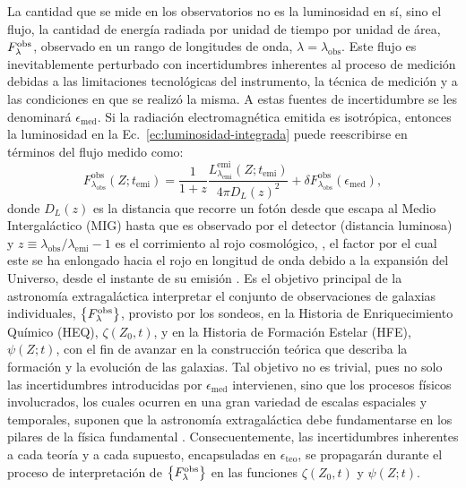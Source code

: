 La cantidad que se mide en los observatorios no es la luminosidad en sí, sino el flujo, \ie la
cantidad de energía radiada por unidad de tiempo por unidad de área, $\sedt[F]{obs}$, observado en
un rango de longitudes de onda, $\lambda=\lambda_\text{obs}$. Este flujo es inevitablemente
perturbado con incertidumbres inherentes al proceso de medición debidas a las limitaciones
tecnológicas del instrumento, la técnica de medición y a las condiciones en que se realizó la misma.
A estas fuentes de incertidumbre se les denominará $\epsilon_\text{med}$. Si la radiación
electromagnética emitida es isotrópica, entonces la luminosidad en la
Ec.~\eqref{ec:luminosidad-integrada} puede reescribirse en términos del flujo medido como:
%
\begin{equation}\label{ec:flujo-integrado}
F_{\lambda_\text{obs}}^\text{obs}(Z;t_\text{emi}) = \frac{1}{1+z}\frac{L_{\lambda_\text{emi}}^\text{emi}(Z;t_\text{emi})}{4\pi D_L(z)^2} + \delta{F_{\lambda_\text{obs}}^\text{obs}}(\epsilon_\text{med}),
\end{equation}
%
donde $D_L(z)$ es la distancia que recorre un fotón desde que escapa al Medio Intergaláctico (MIG)
hasta que es observado por el detector (distancia luminosa) y
$z\equiv\lambda_\text{obs}/\lambda_\text{emi}-1$ es el corrimiento al rojo cosmológico, \ie, el
factor por el cual este se ha enlongado hacia el rojo en longitud de onda debido a la expansión del
Universo, desde el instante de su emisión \citep{Hogg1999, Hogg2002}. Es el objetivo principal de la
astronomía extragaláctica interpretar el conjunto de observaciones de galaxias individuales,
$\set{\sedt[F]{obs}}$, provisto por los sondeos, en la Historia de Enriquecimiento Químico (HEQ),
$\zeta(Z_0,t)$, y en la Historia de Formación Estelar (HFE), $\psi(Z;t)$, con el fin de avanzar en
la construcción teórica que describa la formación y la evolución de las galaxias. Tal objetivo no es
trivial, pues no solo las incertidumbres introducidas por $\epsilon_\text{med}$ intervienen, sino
que los procesos físicos involucrados, los cuales ocurren en una gran variedad de escalas espaciales
y temporales, suponen que la astronomía extragaláctica debe fundamentarse en los pilares de la
física fundamental \citep[véase][para revisiones detalladas]{Somerville2015, Naab2017}.
Consecuentemente, las incertidumbres inherentes a cada teoría y a cada supuesto, encapsuladas en
$\epsilon_\text{teo}$, se propagarán durante el proceso de interpretación de $\set{\sedt[F]{obs}}$
en las funciones $\zeta(Z_0,t)$ y $\psi(Z;t)$.

